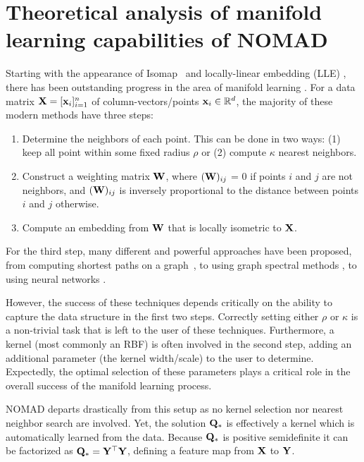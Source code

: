 \documentclass[twoside,11pt]{article}
\begin{document}
\section{Theoretical analysis of manifold learning capabilities of NOMAD}
\label{sec:theory}

Starting with the appearance of Isomap~\citep{Tenenbaum2000} and locally-linear embedding (LLE) \citep{Roweis2000}, there has been outstanding progress in the area of manifold learning \citep[e.g.,][]{Belkin2003,Hadsell2006,Weinberger2006,Weiss2008}.
For a data matrix ${\mathbf{X}} = [ {\mathbf{x}}_i ]_{i=1}^{n}$ of column-vectors/points ${\mathbf{x}}_i \in {\mathbb R}^d$, the majority of these modern methods have three steps:
\begin{enumerate}[nosep]
	\item Determine the neighbors of each point. This can be done in two ways: (1) keep all point within some fixed radius $\rho$ or (2) compute $\kappa$ nearest neighbors.
	\item Construct a weighting matrix ${\mathbf{W}}$, where $({\mathbf{W}})_{ij}$ = 0 if points $i$ and $j$ are not neighbors, and $({\mathbf{W}})_{ij}$ is inversely proportional to the distance between points $i$ and $j$ otherwise.
	\item Compute an embedding from ${\mathbf{W}}$ that is locally isometric to ${\mathbf{X}}$.
\end{enumerate}
For the third step, many different and powerful approaches have been proposed, from computing shortest paths on a graph~\citep{Tenenbaum2000}, to using graph spectral methods \citep{Belkin2003}, to using neural networks \citep{Hadsell2006}.

However, the success of these techniques depends critically on the ability to capture the data structure in the first two steps.
Correctly setting either $\rho$ or $\kappa$ is a non-trivial task that is left to the user of these techniques.
Furthermore, a kernel (most commonly an RBF) is often involved in the second step, adding an additional parameter (the kernel width/scale) to the user to determine.
Expectedly, the optimal selection of these parameters plays a critical role in the overall success of the manifold learning process.

NOMAD departs drastically from this setup as no kernel selection nor nearest neighbor search are involved. Yet, the solution ${\mathbf{Q}}_*$ is effectively a kernel which is automatically learned from the data. Because ${\mathbf{Q}}_*$ is positive semidefinite it can be factorized as ${\mathbf{Q}}_* = {{\mathbf{Y}}}^\top {\mathbf{Y}}$, defining a feature map from ${\mathbf{X}}$ to ${\mathbf{Y}}$.
\end{document}
